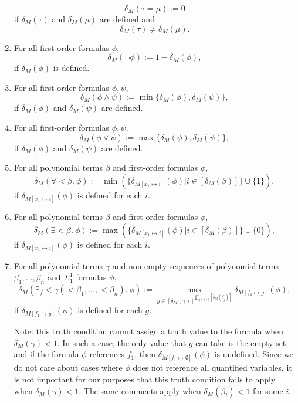 \documentclass[11pt]{article}
\begin{document}
\begin{enumerate}
		\begin{equation}
			\delta_M(\tau = \mu) := 0
		\end{equation}
		if $\delta_M(\tau)$ and $\delta_M(\mu)$ are defined and 
		\begin{equation}
			\delta_M(\tau) \neq \delta_M(\mu).
		\end{equation}
	\item For all first-order formulas $\phi$,
		\begin{equation}
			\delta_M(\neg\phi) := 1 - \delta_M(\phi),
		\end{equation}
		if $\delta_M(\phi)$ is defined.
	\item For all first-order formulas $\phi, \psi$,
		\begin{equation}
			\delta_M(\phi \wedge \psi) := \min\{\delta_M(\phi), \delta_M(\psi)\},
		\end{equation}
		if $\delta_M(\phi)$ and $\delta_M(\psi)$ are defined.
	\item For all first-order formulas $\phi, \psi$,
		\begin{equation}
			\delta_M(\phi \vee \psi) := \max\{\delta_M(\phi), \delta_M(\psi)\},
		\end{equation}
		if $\delta_M(\phi)$ and $\delta_M(\psi)$ are defined.
	\item For all polynomial terms $\beta$ and first-order formulas $\phi$,
		\begin{equation}
			\delta_M(\forall < \beta.\ \phi) := \min(\{\delta_{M[x_1 \mapsto i]}(\phi) | i \in [\delta_M(\beta)]\} \cup \{1\}),
		\end{equation}
		if $\delta_{M[x_1 \mapsto i]}(\phi)$ is defined for each $i$.
	\item For all polynomial terms $\beta$ and first-order formulas $\phi$,
		\begin{equation}
			\delta_M(\exists < \beta.\ \phi) := \max(\{\delta_{M[x_1 \mapsto i]}(\phi) | i \in [\delta_M(\beta)]\} \cup \{0\}), 
		\end{equation}
		if $\delta_{M[x_1 \mapsto i]}(\phi)$ is defined for each $i$.
	\item For all polynomial terms $\gamma$ and non-empty sequences of polynomial terms $\beta_1, ..., \beta_n$ and $\Sigma^1_1$ formulas $\phi$,
		\begin{equation}
			\delta_M(\exists_f < \gamma(<\beta_1, ..., <\beta_n).\ \phi)
			:= \max_{g \in [\delta_M(\gamma)]^{\prod_{j \in [n]} [\delta_M(\beta_j)]}} \delta_{M[f_1 \mapsto g]}(\phi),
		\end{equation}
		if $\delta_{M[f_1 \mapsto g]}(\phi)$ is defined for each $g$.

		Note: this truth condition cannot assign a truth value to the formula when $\delta_M(\gamma) < 1$.
		In such a case, the only value that $g$ can take is the empty set, and
		if the formula $\phi$ references $f_1$, then $\delta_{M[f_1 \mapsto \emptyset]}(\phi)$
		is undefined. Since we do not care about cases where $\phi$ does not reference
		all quantified variables, it is not important for our purposes that this
		truth condition fails to apply when $\delta_M(\gamma) < 1$. The same comments
		apply when $\delta_M(\beta_i) < 1$ for some $i$.
\end{enumerate}
\end{document}
